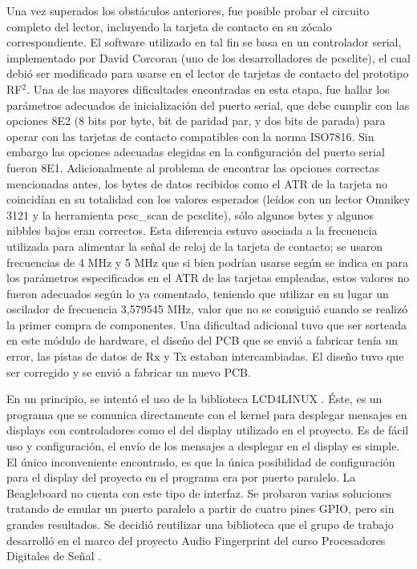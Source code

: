 \bigskip
Una vez superados los obstáculos anteriores, fue posible probar el circuito completo del lector, incluyendo la tarjeta de contacto en su zócalo correspondiente. El software utilizado en tal fin se basa en un controlador serial, implementado por David Corcoran (uno de los desarrolladores de pcsclite), el cual debió ser modificado para usarse en el lector de tarjetas de contacto del prototipo RF$^{2}$. Una de las mayores dificultades encontradas en esta etapa, fue hallar los parámetros adecuados de inicialización del puerto serial, que debe cumplir con las opciones 8E2 (8 bits por byte, bit de paridad par, y dos bits de parada) para operar con las tarjetas de contacto compatibles
con la norma ISO7816. Sin embargo las opciones adecuadas elegidas en la configuración del puerto serial fueron 8E1.
Adicionalmente al problema de encontrar las opciones correctas mencionadas antes, los bytes de datos
recibidos como el ATR de la tarjeta no coincidían en su totalidad con los valores esperados (leídos con un lector Omnikey 3121 y la herramienta pcsc\_scan de pcsclite), sólo algunos bytes y algunos nibbles bajos eran correctos.
Esta diferencia estuvo asociada a la frecuencia utilizada para alimentar la señal de reloj de la tarjeta de contacto;
se usaron frecuencias de 4 MHz y 5 MHz que si bien podrían usarse según se indica en \cite{SCHb} para
los parámetros especificados en el ATR de las tarjetas empleadas, estos valores no fueron adecuados según lo ya comentado, teniendo que utilizar en su lugar un oscilador de frecuencia 3,579545 MHz, valor que no se consiguió cuando se realizó
la primer compra de componentes.
Una dificultad adicional tuvo que ser sorteada en este módulo de hardware, el diseño del PCB que se envió a fabricar
tenía un error, las pistas de datos de Rx y Tx estaban intercambiadas. El diseño tuvo que ser corregido y se 
envió a fabricar un nuevo PCB.


\bigskip
\bigskip
{}

En un principio, se intentó el uso de la biblioteca LCD4LINUX \cite{lcd4linux}. Éste, es un programa que se comunica directamente con el kernel para desplegar mensajes en displays con controladores como  el del display utilizado en el proyecto. Es de fácil uso y configuración, el envío de los mensajes a desplegar en el display es simple. El único inconveniente encontrado, es que la única posibilidad de configuración para el display del proyecto en el programa era por puerto paralelo. La Beagleboard no cuenta con este tipo de interfaz. Se probaron varias soluciones tratando de emular un puerto paralelo a partir de cuatro pines GPIO, pero sin grandes resultados. Se decidió reutilizar una biblioteca que el grupo de trabajo desarrolló en el marco del proyecto Audio Fingerprint del curso Procesadores Digitales de Señal \cite{Audiofingerprint}.

